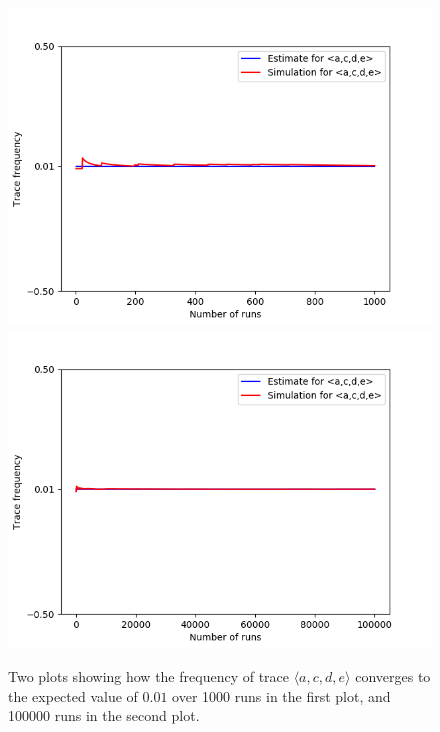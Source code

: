 \begin{figure}%
    \centering
    {{\includegraphics[width=12cm]{figures/acde1.png} }}%
    \qquad
    {{\includegraphics[width=12cm]{figures/acde100.png} }}%
    \caption{Two plots showing how the frequency of trace $\langle a,c,d,e \rangle$ converges to the expected value of $0.01$ over 1000 runs in the first plot, and 100000 runs in the second plot.}%
    \label{fig: acde}%
\end{figure}
%
%
%
%
%
%
